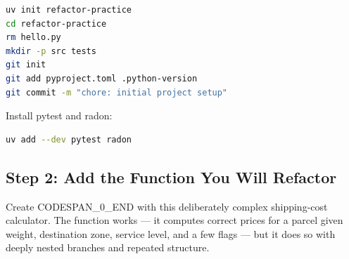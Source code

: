 \documentclass[11pt,a4paper]{book}
\begin{document}
\begin{lstlisting}[language=Bash]
uv init refactor-practice
cd refactor-practice
rm hello.py
mkdir -p src tests
git init
git add pyproject.toml .python-version
git commit -m "chore: initial project setup"
\end{lstlisting}

Install pytest and radon:

\begin{lstlisting}[language=Bash]
uv add --dev pytest radon
\end{lstlisting}

\medskip

\subsection{Step 2: Add the Function You Will Refactor}

Create CODESPAN\_0\_END with this deliberately complex shipping-cost calculator. The function works --- it computes correct prices for a parcel given weight, destination zone, service level, and a few flags --- but it does so with deeply nested branches and repeated structure.
\end{document}
